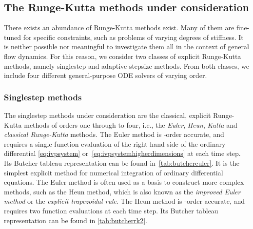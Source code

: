 \subsection{The Runge-Kutta methods under consideration}
\label{sub:the_runge_kutta_methods_under_consideration}

There exists an abundance of Runge-Kutta methods exist. Many of them are
fine-tuned for specific constraints, such as problems of varying degrees of
stiffness. It is neither possible nor meaningful to investigate them all
in the context of general flow dynamics. For this reason, we consider two classes
of explicit Runge-Kutta methods, namely singlestep and adaptive stepsize
methods. From both classes, we include four different general-purpose ODE solvers
of varying order.

\subsubsection{Singlestep methods}
\label{ssub:singlestep_methods}

The singlestep methods under consideration are the classical, explicit
Runge-Kutta methods of orders one through to four, i.e., the \emph{Euler},
\emph{Heun}, \emph{Kutta} and \emph{classical Runge-Kutta} methods. The
Euler method is -order accurate, and requires a single function
evaluation of the right hand side of the ordinary differential
\cref{eq:ivpsystem} or~\eqref{eq:ivpsystemhigherdimensions} at each time step.
Its Butcher tableau representation can be found in~\cref{tab:butchereuler}.
It is the simplest explicit method for numerical integration of ordinary
differential equations. The Euler method is often used as a basis to construct
more complex methods, such as the Heun method, which is also known as the
\emph{improved Euler method} or the \emph{explicit trapezoidal rule}. The Heun
method is -order accurate, and requires two function evaluations at each
time step. Its Butcher tableau representation can be found in
\cref{tab:butcherrk2}.


\clearpage


